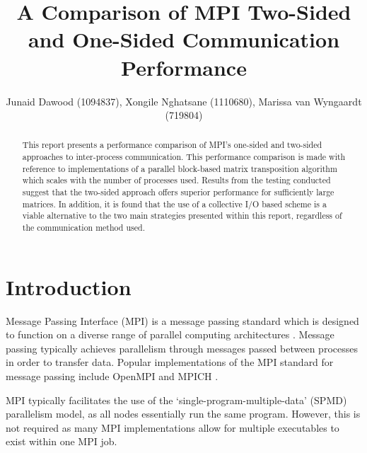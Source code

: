 \documentclass[journal,10pt,a4paper]{IEEEtran}
\begin{document}
%
\title{A Comparison of MPI Two-Sided and One-Sided Communication Performance}

\author{Junaid Dawood (1094837), Xongile Nghatsane (1110680), Marissa van Wyngaardt (719804)}%



\maketitle


\begin{abstract}
This report presents a performance comparison of MPI's one-sided and two-sided approaches to inter-process communication. This performance comparison is made with reference to implementations of a parallel block-based matrix transposition algorithm which scales with the number of processes used. Results from the testing conducted suggest that the two-sided approach offers superior performance for sufficiently large matrices. In addition, it is found that the use of a collective I/O based scheme is a viable alternative to the two main strategies presented within this report, regardless of the communication method used.

\end{abstract}

\IEEEpeerreviewmaketitle

\section{Introduction}
Message Passing Interface (MPI) is a message passing standard which is designed to function on a diverse range of parallel computing architectures \cite{MPIAMess20:online}. Message passing typically achieves parallelism through messages passed between processes in order to transfer data. Popular implementations of the MPI standard for message passing include OpenMPI and MPICH \cite{ompi,mpich}.

MPI typically facilitates the use of the `single-program-multiple-data' (SPMD) parallelism model, as all nodes essentially run the same program. However, this is not required as many MPI implementations allow for multiple executables to exist within one MPI job. 
\end{document}
